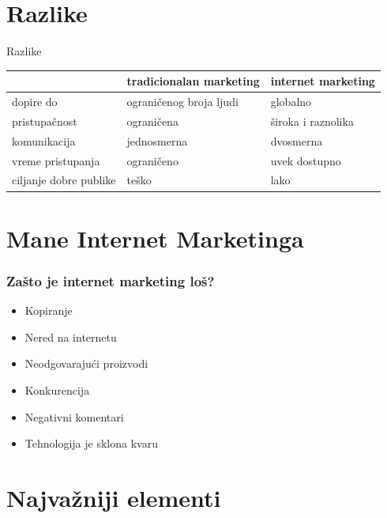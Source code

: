 \documentclass{beamer}
\begin{document}
\section{Razlike}
\begin{frame}{Razlike}
\begin{center}
\begin{tabular}{|p{2cm}|p{3.1cm}|p{3.1cm}|} \hline
     &\centering tradicionalan marketing& internet marketing\\ \hline
 \centering dopire do& ograničenog broja \centering ljudi & globalno\\   \hline
\centering pristupačnost & ograničena& široka i raznolika\\ \hline
\centering komunikacija & jednosmerna& dvosmerna\\\hline
 \centering vreme pristupanja& ograničeno& uvek dostupno \\ \hline
\centering ciljanje dobre  publike &  teško &  lako  \\ \hline
\end{tabular}
\label{tab:tabela1}
\end{center}
\end{frame}


\section{Mane Internet Marketinga}

\begin{frame}[fragile]\frametitle{Zašto je internet marketing loš?}
	\begin{itemize}	
		\item  Kopiranje
		\item  Nered na internetu
		\item  Neodgovarajući proizvodi
		\item  Konkurencija
		\item  Negativni komentari
		\item  Tehnologija je sklona kvaru
	\end{itemize}
\end{frame}



\section{Najvažniji elementi}
\end{document}
